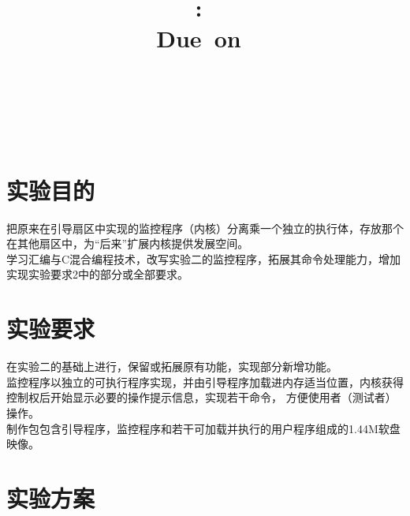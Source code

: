 \documentclass[a4paper]{article}
\title{
\vspace{2in}
\textmd{\textbf{\hmwkClass:\ \hmwkTitle}}\\
\normalsize\vspace{0.1in}\small{Due\ on\ \hmwkDueDate}\\
\vspace{0.1in}\large{\textit{\hmwkClassInstructor\ \hmwkClassTime}}
\vspace{3in}
}
\author{\textbf{\LARGE{\hmwkAuthorName}} \\ \\ \textbf{\LARGE{\hmwkAuthorId}}}
\date{} %
\begin{document}

\maketitle




\renewcommand{\contentsname}{Content} %
\newpage
\tableofcontents
{}
\newpage



\section{实验目的}
把原来在引导扇区中实现的监控程序（内核）分离乘一个独立的执行体，存放那个在其他扇区中，为``后来''扩展内核提供发展空间。\\

学习汇编与C混合编程技术，改写实验二的监控程序，拓展其命令处理能力，增加实现实验要求2中的部分或全部要求。
\section{实验要求}
在实验二的基础上进行，保留或拓展原有功能，实现部分新增功能。\\

监控程序以独立的可执行程序实现，并由引导程序加载进内存适当位置，内核获得控制权后开始显示必要的操作提示信息，实现若干命令，
方便使用者（测试者）操作。\\

制作包包含引导程序，监控程序和若干可加载并执行的用户程序组成的1.44M软盘映像。\\

\section{实验方案}
\end{document}
